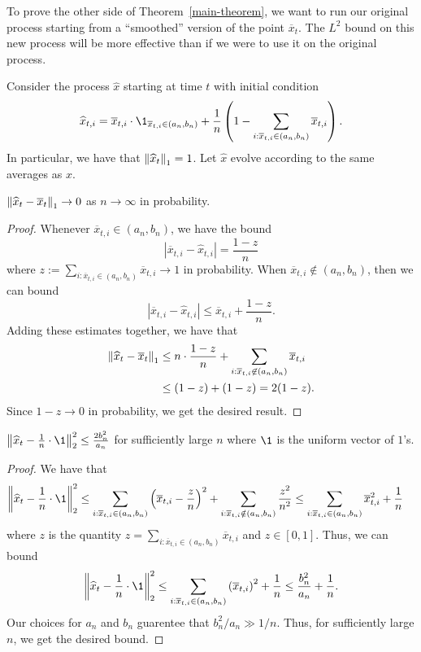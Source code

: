 \documentclass[12pt]{article}
\begin{document}
To prove the other side of Theorem~\ref{main-theorem}, we want to run our original process starting from a ``smoothed'' version of the point $\overline{x}_t$. The $L^2$ bound on this new process will be more effective than if we were to use it on the original process. 
\begin{defn}
	Consider the process $\widehat{x}$ starting at time $t$ with initial condition
	\[
		\widehat{x}_{t, i} = \overline{x}_{t, i} \cdot \1_{\overline{x}_{t, i} \in (a_n, b_n)} + \frac{1}{n} \left ( 1 - \sum_{i : \overline{x}_{t, i} \in (a_n, b_n)} \overline{x}_{t, i} \right ).
	\]
	In particular, we have that $\left\lVert \widehat{x}_t \right\rVert_1 = 1$. Let $\widehat{x}$ evolve according to the same averages as $x$. 
\end{defn}

\begin{lem}
	$\left\lVert \widehat{x}_t - \overline{x}_t \right\rVert_1 \to 0$ as $n \to \infty$ in probability. 
\end{lem}
\begin{proof}
	Whenever $\overline{x}_{t, i} \in (a_n, b_n)$, we have the bound
	\[
		|\overline{x}_{t, i} - \widehat{x}_{t, i}| = \frac{1 - z}{n}
	\]
	where $z := \sum_{i : \overline{x}_{t, i} \in (a_n, b_n)} \overline{x}_{t, i} \to 1$ in probability. When $\overline{x}_{t, i} \not\in (a_n, b_n)$, then we can bound
	\[
		| \overline{x}_{t,i} - \widehat{x}_{t, i}| \leq \overline{x}_{t, i} + \frac{1-z}{n}.
	\]
	Adding these estimates together, we have that
	\begin{align*}
		\left\lVert \widehat{x}_t - \overline{x}_t \right\rVert_1 & \leq n \cdot \frac{1-z}{n} + \sum_{i : \overline{x}_{t, i} \not\in (a_n, b_n)} \overline{x}_{t, i} \\
		& \leq (1-z) + (1 - z) = 2(1-z).
	\end{align*}
	Since $1-z \to 0$ in probability, we get the desired result.
\end{proof}
\begin{lem}
	$\norm{\widehat{x}_t - \frac{1}{n} \cdot \1}_2^2 \leq \frac{2b_n^2}{a_n}$ for sufficiently large $n$ where $\1$ is the uniform vector of $1$'s.
\end{lem}

\begin{proof}
	We have that 
	\begin{align*}
		\norm{\widehat{x}_t - \frac{1}{n} \cdot \1}_2^2 & \leq \sum_{i : \overline{x}_{t, i} \in (a_n, b_n)} \left ( \overline{x}_{t, i} - \frac{z}{n} \right )^2 + \sum_{i : \overline{x}_{t, i} \notin (a_n, b_n)} \frac{z^2}{n^2} \leq \sum_{i : \overline{x}_{t, i} \in (a_n, b_n)} \overline{x}_{t, i}^2 + \frac{1}{n}
	\end{align*}
	where $z$ is the quantity $z = \sum_{i : \overline{x}_{t, i} \in (a_n, b_n)} \overline{x}_{t, i}$ and $z \in [0, 1]$. 
	Thus, we can bound 
	\[
		\norm{\widehat{x}_t - \frac{1}{n} \cdot \1}_2^2	\leq \sum_{i : \overline{x}_{t, i} \in (a_n, b_n)} \left ( \overline{x}_{t, i} \right )^2 + \frac{1}{n} \leq \frac{b_n^2}{a_n} + \frac{1}{n}.
	\]
	Our choices for $a_n$ and $b_n$ guarentee that $b_n^2 / a_n \gg 1/n$. Thus, for sufficiently large $n$, we get the desired bound.
\end{proof}
\end{document}
